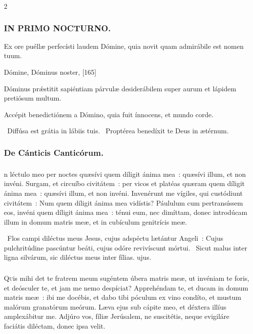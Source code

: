 \documentclass[9pt,twoside]{extarticle}
\begin{document}
\begin{multicols}{2}
{\subsubsection*{\center \textsc{IN PRIMO NOCTURNO.}}
\begin{tightlist}{}
\item {} Ex ore puéllæ perfecísti laudem Dómine, quia novit quam admirábile est nomen tuum.
\item {} Dómine, Dóminus noster,  [165]
\item {} Dóminus prǽstitit sapiéntiam párvulæ desiderábilem super aurum et lápidem pretiósum multum.
\item {} Accépit benedictiónem a Dómino, quia fuit ínnocens, et mundo corde.
\item {}~Diffúsa est grátia in lábiis tuis. ~Proptérea benedíxit te Deus in ætérnum.
\item {}
\end{tightlist}

\subsubsection*{\center De Cánticis Canticórum.}
\subsubsection*{\center {}}
n léctulo meo per noctes quæsívi quem díligit ánima mea~: quæsívi illum, et non invéni. Surgam, et circuíbo civitátem~: per vicos et platéas quæram quem díligit ánima mea~: quæsívi illum, et non invéni. Invenérunt me vígiles, qui custódiunt civitátem~: Num quem díligit ánima mea vidístis? Páululum cum pertransíssem eos, invéni quem díligit ánima mea~: ténui eum, nec dimíttam, donec introdúcam illum in domum matris meæ, et in cubículum genitrícis meæ.

\begin{tightlist}{}
\item {}~Flos campi diléctus meus Jesus, cujus adspéctu lætántur Angeli~: \textred{*} Cujus pulchritúdine pascúntur beáti, cujus odóre revivíscunt mórtui. ~Sicut malus inter ligna silvárum, sic diléctus meus inter fílias. ujus.
\end{tightlist}

\subsubsection*{\center {}}
\lettrine{Q}uis mihi det te fratrem meum sugéntem úbera matris meæ, ut invéniam te foris, et deósculer te, et jam me nemo despíciat? Apprehéndam te, et ducam in domum matris meæ~: ibi me docébis, et dabo tibi póculum ex vino condíto, et mustum malórum granatórum meórum. Læva ejus sub cápite meo, et déxtera illíus amplexábitur me. Adjúro vos, fíliæ Jerúsalem, ne suscitétis, neque evigiláre faciátis diléctam, donec ipsa velit.

}
\end{multicols}
\end{document}
